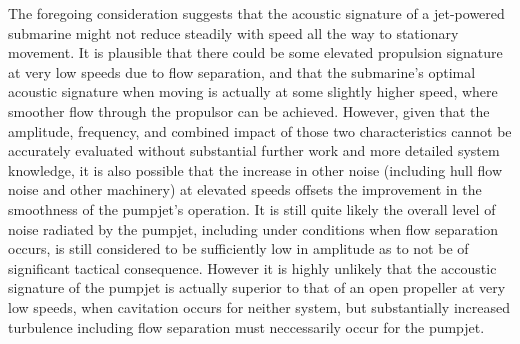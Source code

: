 \documentclass{article}\usepackage[]{graphicx}\usepackage[]{color}
\begin{document}
The foregoing consideration suggests that the acoustic signature of a jet-powered submarine might not reduce steadily with speed all the way to stationary movement.  It is plausible that there could be some elevated propulsion signature at very low speeds due to flow separation, and that the submarine's optimal acoustic signature when moving is actually at some slightly higher speed, where smoother flow through the propulsor can be achieved.  However, given that the amplitude, frequency, and combined impact of those two characteristics cannot be accurately evaluated without substantial further work and more detailed system knowledge, it is also possible that the increase in other noise (including hull flow noise and other machinery) at elevated speeds offsets the improvement in the smoothness of the pumpjet's operation.  It is still quite likely the overall level of noise radiated by the pumpjet, including under conditions when flow separation occurs, is still considered to be sufficiently low in amplitude as to not be of significant tactical consequence.  However it is highly unlikely that the accoustic signature of the pumpjet is actually superior to that of an open propeller at very low speeds, when cavitation occurs for neither system, but substantially increased turbulence including flow separation must neccessarily occur for the pumpjet.

\newpage

\printbibliography

\newpage
\end{document}
